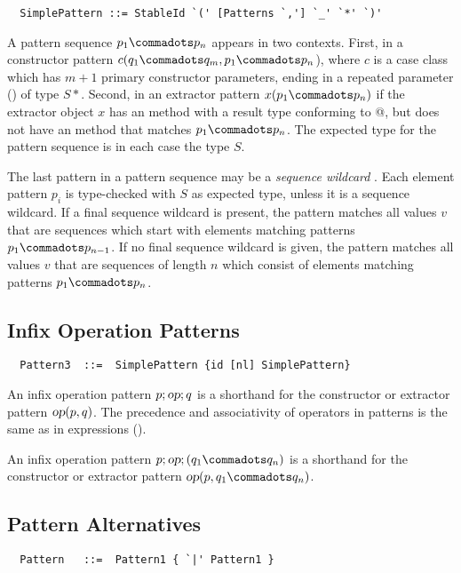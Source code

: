 \syntax\begin{lstlisting}
  SimplePattern ::= StableId `(' [Patterns `,'] `_' `*' `)'
\end{lstlisting}

A pattern sequence $p_1 \commadots p_n$ appears in two
contexts. First, in a constructor pattern
$c(q_1 \commadots q_m, p_1 \commadots p_n$), where $c$ is a case
class which has $m+1$ primary constructor parameters, 
ending in a repeated parameter () of type 
$S*$. Second, in an extractor pattern
$x(p_1 \commadots p_n)$ if the extractor object $x$ has an
 method with a result type conforming to 
\lstinline@Seq[$S$]@, but does not have an  method that 
matches $p_1 \commadots p_n$.
The expected type for the pattern sequence is in each case the type $S$.

The last pattern in a pattern sequence may be a {\em sequence
wildcard} \code{_*}. Each element pattern $p_i$ is type-checked with
$S$ as expected type, unless it is a sequence wildcard. If a final
sequence wildcard is present, the pattern matches all values $v$ that
are sequences which start with elements matching patterns
$p_1 \commadots p_{n-1}$.  If no final sequence wildcard is given, the
pattern matches all values $v$ that are sequences of
length $n$ which consist of elements matching patterns $p_1 \commadots
p_n$.

\subsection{Infix Operation Patterns}

\syntax\begin{lstlisting}
  Pattern3  ::=  SimplePattern {id [nl] SimplePattern}
\end{lstlisting}

An infix operation pattern $p;\mbox{\sl op};q$ is a shorthand for the
constructor or extractor pattern $\mbox{\sl op}(p, q)$.  The precedence and
associativity of operators in patterns is the same as in expressions
().

An infix operation pattern $p;\op;(q_1 \commadots q_n)$ is a
shorthand for the constructor or extractor pattern $\op(p, q_1
\commadots q_n)$.

\subsection{Pattern Alternatives}

\syntax\begin{lstlisting}
  Pattern   ::=  Pattern1 { `|' Pattern1 }
\end{lstlisting}

